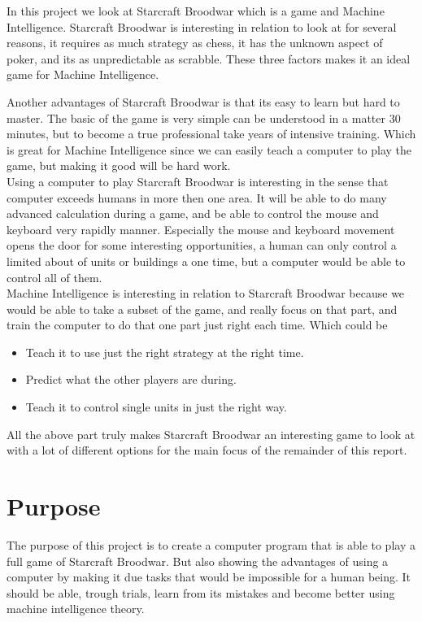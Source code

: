 In this project we look at Starcraft Broodwar which is a \abrts game and Machine Intelligence. Starcraft Broodwar is interesting in relation to look at for several reasons, it requires as much strategy as chess, it has the unknown aspect of poker, and its as unpredictable as scrabble. These three factors makes it an ideal game for Machine Intelligence.

Another advantages of Starcraft Broodwar is that its easy to learn but hard to master. The basic of the game is very simple can be understood in a matter 30 minutes, but to become a true professional take years of intensive training. Which is great for Machine Intelligence since we can easily teach a computer to play the game, but making it good will be hard work.\\

Using a computer to play Starcraft Broodwar is interesting in the sense that computer exceeds humans in more then one area. It will be able to do many advanced calculation during a game, and be able to control the mouse and keyboard very rapidly manner. Especially the mouse and keyboard movement opens the door for some interesting opportunities, a human can only control a limited about of units or buildings a one time, but a computer would be able to control all of them. \\

Machine Intelligence is interesting in relation to Starcraft Broodwar because we would be able to take a subset of the game, and really focus on that part, and train the computer to do that one part just right each time. Which could be
\begin{itemize}
	\item Teach it to use just the right strategy at the right time.
	\item Predict what the other players are during.
	\item Teach it to control single units in just the right way.
\end{itemize}

All the above part truly makes Starcraft Broodwar an interesting game to look at with a lot of different options for the main focus of the remainder of this report.

\section{Purpose}

	The purpose of this project is to create a computer program that is able to play a full game of Starcraft Broodwar. But also showing the advantages of using a computer by making it due tasks that would be impossible for a human being. It should be able, trough trials, learn from its mistakes and become better using machine intelligence theory. 



